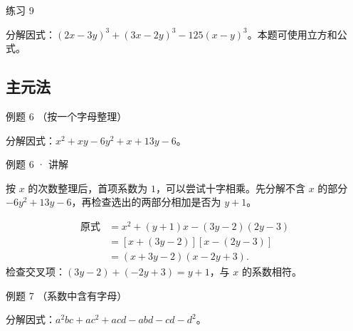 \begin{problem}{练习 9 \starred}

分解因式：$(2x-3y)^3+(3x-2y)^3-125(x-y)^3$。本题可使用立方和公式。

\end{problem}


\subsection{主元法}



\begin{problem}{例题 6 （按一个字母整理）}

分解因式：$x^2+xy-6y^2+x+13y-6$。

\end{problem}


\begin{solution}{例题 6 · 讲解}

\think 按 $x$ 的次数整理后，首项系数为 $1$，可以尝试十字相乘。先分解不含 $x$ 的部分 $-6y^2+13y-6$，再检查选出的两部分相加是否为 $y+1$。

\solve \begin{align*}
\text{原式}&=x^2+(y+1)x-(3y-2)(2y-3)\\
&=[x+(3y-2)][x-(2y-3)]\\
&=(x+3y-2)(x-2y+3).
\end{align*}
检查交叉项：$(3y-2)+(-2y+3)=y+1$，与 $x$ 的系数相符。


\end{solution}


\begin{problem}{例题 7 （系数中含有字母）}

分解因式：$a^2bc+ac^2+acd-abd-cd-d^2$。

\end{problem}


